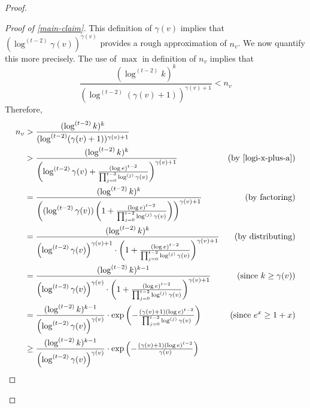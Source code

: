 \documentclass[kpfonts]{patmorin}
\theoremstyle{named}
\begin{document}
\begin{proof}
\begin{proof}[Proof of \cref{main-claim}]
        This definition of $\gamma(v)$ implies that $(\log^{(t-2)}\gamma(v))^{\gamma(v)}$ provides a rough approximation of $n_v$.  We now quantify this more precisely. The use of $\max$ in definition of $n_v$ implies that
        \[
            \frac{(\log^{(t-2)} k)^k}{(\log^{(t-2)}(\gamma(v)+1))^{\gamma(v)+1}} < n_v
        \]
        Therefore,
        \begin{align*}
           n_v
           & > \frac{(\log^{(t-2)} k)^k}{(\log^{(t-2)}(\gamma(v)+1))^{\gamma(v)+1}} \\
           & > \frac{
                    (\log^{(t-2)} k)^{k}
                    }{
                    \left(\log^{(t-2)}\gamma(v) + \tfrac{(\log e)^{t-2}}{\prod_{j=0}^{t-3}\log^{(j)} \gamma(v)}\right)^{\gamma(v)+1}}
                & \text{(by \cref{logi-x-plus-a})} \\
        & = \frac{
                 (\log^{(t-2)} k)^{k}
                 }{
                 \left((\log^{(t-2)}\gamma(v))\left(1 + \tfrac{(\log e)^{t-2}}{\prod_{j=0}^{t-2}\log^{(j)} \gamma(v)}\right)\right)^{\gamma(v)+1}}
             & \text{(by factoring)} \\
         & = \frac{
                  (\log^{(t-2)} k)^{k}
                  }{
                  \left(\log^{(t-2)}\gamma(v)\right)^{\gamma(v)+1}
                  \cdot
                  \left(1 + \tfrac{(\log e)^{t-2}}{\prod_{j=0}^{t-2}\log^{(j)} \gamma(v)}\right)^{\gamma(v)+1}}
              & \text{(by distributing)} \\
          & = \frac{
                   (\log^{(t-2)} k)^{k-1}
                   }{
                   \left(\log^{(t-2)}\gamma(v)\right)^{\gamma(v)}
                   \cdot
                   \left(1 + \tfrac{(\log e)^{t-2}}{\prod_{j=0}^{t-2}\log^{(j)} \gamma(v)}\right)^{\gamma(v)+1}}
               & \text{(since $k\ge\gamma(v)$)} \\
           & = \frac{
                    (\log^{(t-2)} k)^{k-1}
                    }{
                    \left(\log^{(t-2)}\gamma(v)\right)^{\gamma(v)}
                    }
                    \cdot
                    \exp\left(-\tfrac{(\gamma(v)+1)(\log e)^{t-2}}{\prod_{j=0}^{t-2}\log^{(j)} \gamma(v)}\right)
                & \text{(since $e^x\ge 1+x$)} \\
            & \ge \frac{
                     (\log^{(t-2)} k)^{k-1}
                     }{
                     \left(\log^{(t-2)}\gamma(v)\right)^{\gamma(v)}
                     }
                     \cdot
                     \exp\left(-\tfrac{(\gamma(v)+1)(\log e)^{t-2}}{\gamma(v)}\right)

\end{align*}
\end{proof}
\end{proof}
\end{document}
